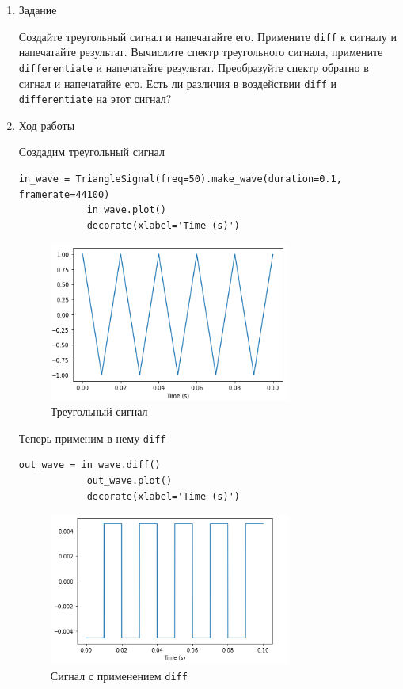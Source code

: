 \documentclass[a4paper,12pt]{article}
\begin{document}
	\begin{enumerate}
		
		\item{Задание}
		
		Создайте треугольный сигнал и напечатайте его. Примените \texttt{diff} к сигналу и напечатайте результат. Вычислите спектр треугольного сигнала, примените \texttt{differentiate} и напечатайте результат. Преобразуйте спектр обратно в сигнал и напечатайте его. Есть ли различия в воздействии \texttt{diff} и \texttt{differentiate} на этот сигнал?
		
		\item{Ход работы}
		
		Создадим треугольный сигнал
		\begin{lstlisting}[caption=Создаем треугольный сигнал]
			in_wave = TriangleSignal(freq=50).make_wave(duration=0.1, framerate=44100)
			in_wave.plot()
			decorate(xlabel='Time (s)')
		\end{lstlisting}
		\begin{figure}[H]
			\centering
			\includegraphics[width=0.75\textwidth]{2_1.png}
			\caption{Треугольный сигнал}
			\label{fig:2.1}
		\end{figure}
		
		Теперь применим в нему \texttt{diff}
		\begin{lstlisting}[caption=Применяем \texttt{diff}]
			out_wave = in_wave.diff()
			out_wave.plot()
			decorate(xlabel='Time (s)')
		\end{lstlisting}
		\begin{figure}[H]
			\centering
			\includegraphics[width=0.75\textwidth]{2_2.png}
			\caption{Сигнал с применением \texttt{diff}}
			\label{fig:2.2}
		\end{figure}
		

\end{enumerate}
\end{document}
